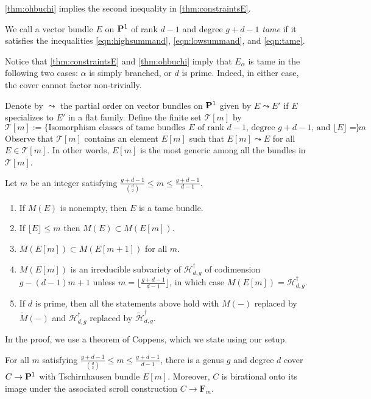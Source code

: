 \documentclass{article}
\renewcommand {\P}{{\bf P}}
\renewcommand{\H}{\mathcal H}
\newcommand{\td}{\widetilde}
\newcommand{\F}{{\mathbf F}}
\numberwithin{equation}{section}
\begin{document}
\begin{remark}
\autoref{thm:ohbuchi} implies the second inequality in \autoref{thm:constraintsE}.
\end{remark}

\begin{definition}
  We call a vector bundle $E$ on $\P^1$ of rank $d-1$ and degree $g+d-1$ \emph{tame} if it satisfies the inequalities \eqref{eqn:highsummand}, \eqref{eqn:lowsummand}, and \eqref{eqn:tame}.
\end{definition}
Notice that \autoref{thm:constraintsE} and \autoref{thm:ohbuchi} imply that $E_\alpha$ is tame in the following two cases: $\alpha$ is simply branched, or $d$ is prime. Indeed, in either case, the cover cannot factor non-trivially.

Denote by $\leadsto$ the partial order on vector bundles on $\P^1$ given by $E \leadsto E'$ if $E$ specializes to $E'$ in a flat family. Define the finite set ${\mathcal T}[m]$ by
\[ {\mathcal T}[m] := \{\text{Isomorphism classes of tame bundles $E$ of rank $d-1$, degree $g+d-1$, and $\lfloor E \rfloor = m$}\}.\]
Observe that $\mathcal T[m]$ contains an element $E[m]$ such that $E[m] \leadsto E$ for all $E \in \mathcal T[m]$. In other words, $E[m]$ is the most generic among all the bundles in $\mathcal T[m]$.
\begin{theorem}\label{thm:maroniloci}
  Let $m$ be an integer satisfying $\frac{g+d-1}{{d \choose 2}} \leq m \leq  \frac{g+d-1}{d-1} $.
  \begin{enumerate}
  \item If $M(E)$ is nonempty, then $E$ is a tame bundle.
  \item If $\lfloor E \rfloor \leq m$ then $M(E) \subset M(E[m])$.
  \item $M(E[m]) \subset M(E[m+1])$ for all $m$.   
  \item $M(E[m])$ is an irreducible subvariety of $\H_{d,g}^\dagger$ of codimension $g-(d-1)m + 1$ unless $m = \lfloor \frac{g+d-1}{d-1} \rfloor$, in which case $M(E[m]) =  \H_{d,g}^\dagger$.
  \item If $d$ is prime, then all the statements above hold with $M(-)$ replaced by $\td M(-)$ and $\mathcal H^\dagger_{d,g}$ replaced by $\td {\mathcal H}^\dagger_{d,g}$.
  \end{enumerate}
\end{theorem}
In the proof, we use a theorem of Coppens, which we state using our setup.
\begin{theorem}\label{thm:coppens}
  For all $m$ satisfying $\frac{g+d-1}{{d \choose 2}} \leq m \leq \frac{g+d-1}{d-1}$, there is a genus $g$ and degree $d$ cover $C \to \P^1$ with Tschirnhausen bundle $E[m]$. Moreover, $C$ is birational onto its image under the associated scroll construction $C \to \F_m$.
\end{theorem}
\end{document}
